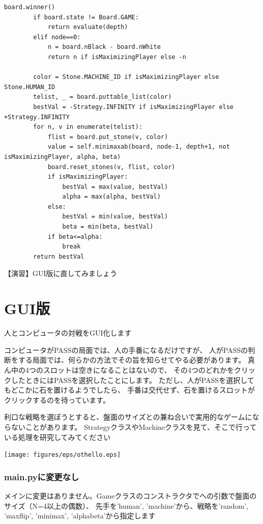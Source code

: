\documentclass[uplatex,a4paper,11pt,oneside,openany]{jsbook}
\begin{document}
\begin{lstlisting}[caption=Strategy class,label=othello06]
        board.winner()
        if board.state != Board.GAME:
            return evaluate(depth)
        elif node==0:
            n = board.nBlack - board.nWhite
            return n if isMaximizingPlayer else -n

        color = Stone.MACHINE_ID if isMaximizingPlayer else Stone.HUMAN_ID
        telist, _ = board.puttable_list(color)
        bestVal = -Strategy.INFINITY if isMaximizingPlayer else +Strategy.INFINITY
        for n, v in enumerate(telist):
            flist = board.put_stone(v, color)
            value = self.minimaxab(board, node-1, depth+1, not isMaximizingPlayer, alpha, beta)
            board.reset_stones(v, flist, color)
            if isMaximizingPlayer:
                bestVal = max(value, bestVal)
                alpha = max(alpha, bestVal)
            else:
                bestVal = min(value, bestVal)
                beta = min(beta, bestVal)
            if beta<=alpha:
                break
        return bestVal
\end{lstlisting}

【演習】GUI版に直してみましょう

\section{GUI版}

人とコンピュータの対戦をGUI化します

コンピュータがPASSの局面では、人の手番になるだけですが、
人がPASSの判断をする局面では、何らかの方法でその旨を知らせてやる必要があります。
真ん中の4つのスロットは空きになることはないので、
その4つのどれかをクリックしたときにはPASSを選択したことにします。
ただし、人がPASSを選択してもどこかに石を置けるようでしたら、
手番は交代せず、石を置けるスロットがクリックするのを待っています。

利口な戦略を選ぼうとすると、盤面のサイズとの兼ね合いで実用的なゲームにならないことがあります。
StrategyクラスやMachineクラスを見て、そこで行っている処理を研究してみてください

\begin{center}
  \texttt{[image: figures/eps/othello.eps]}
\end{center}

\subsubsection{main.pyに変更なし}

メインに変更はありません。Gameクラスのコンストラクタでへの引数で盤面のサイズ（N=4以上の偶数）、
先手を'human', 'machine'から、戦略を'random', 'maxflip', 'minimax', 'alphabeta'から指定します
\end{document}
